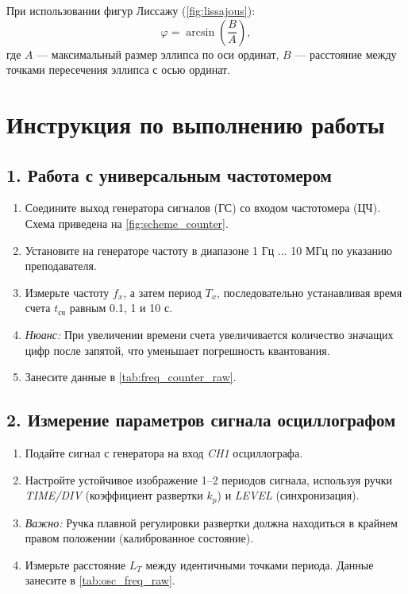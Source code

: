 При использовании фигур Лиссажу (\cref{fig:lissajous}):
\begin{equation}
    \varphi = \arcsin\left(\frac{B}{A}\right),
    \label{eq:phase_lissajous}
\end{equation}
где $A$ — максимальный размер эллипса по оси ординат, $B$ — расстояние между точками пересечения эллипса с осью ординат.

\section*{Инструкция по выполнению работы}

\subsection*{1. Работа с универсальным частотомером}
\begin{enumerate}
    \item Соедините выход генератора сигналов (ГС) со входом частотомера (ЦЧ). Схема приведена на \cref{fig:scheme_counter}.
    \item Установите на генераторе частоту в диапазоне 1 Гц ... 10 МГц по указанию преподавателя.
    \item Измерьте частоту $f_x$, а затем период $T_x$, последовательно устанавливая время счета $t_{\text{сч}}$ равным 0.1, 1 и 10 с.
    \item \textit{Нюанс:} При увеличении времени счета увеличивается количество значащих цифр после запятой, что уменьшает погрешность квантования.
    \item Занесите данные в \cref{tab:freq_counter_raw}.
\end{enumerate}

\subsection*{2. Измерение параметров сигнала осциллографом}
\begin{enumerate}
    \item Подайте сигнал с генератора на вход \textit{CH1} осциллографа.
    \item Настройте устойчивое изображение 1–2 периодов сигнала, используя ручки \textit{TIME/DIV} (коэффициент развертки $k_p$) и \textit{LEVEL} (синхронизация).
    \item \textit{Важно:} Ручка плавной регулировки развертки должна находиться в крайнем правом положении (калиброванное состояние).
    \item Измерьте расстояние $L_T$ между идентичными точками периода. Данные занесите в \cref{tab:osc_freq_raw}.
\end{enumerate}

